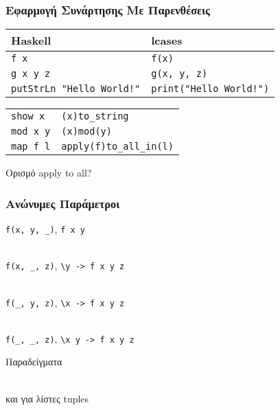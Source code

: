 \documentclass{beamer}
\def\e{\foreignlanguage{english}}
\begin{document}
\begin{frame}[fragile]

\frametitle{Εφαρμογή Συνάρτησης Με Παρενθέσεις}

\begin{otherlanguage}{english}

\begin{center}
\begin{tabular}{ |P{5cm}|P{5cm}| }
 \hline
 Haskell & lcases
 \\
 \hline
 \verb|f x| & \verb|f(x)|
 \\
 \verb|g x y z| & \verb|g(x, y, z)|
 \\
 \verb|putStrLn "Hello World!"| & \verb|print("Hello World!")|
 \\
 \hline
\end{tabular}
\end{center}

\begin{center}
\begin{tabular}{ |P{5cm}|P{5cm}| }
 \hline
 \verb|show x| & \verb|(x)to_string|
 \\
 \verb|mod x y| & \verb|(x)mod(y)|
 \\
 \verb|map f l| & \verb|apply(f)to_all_in(l)|
 \\
 \hline
\end{tabular}
\end{center}

\end{otherlanguage}
Ορισμό \e{apply to all}?

\end{frame}

\begin{frame}[fragile]

\frametitle{Ανώνυμες Παράμετροι}


\begin{otherlanguage}{english}

\verb|f(x, y, _)|, \verb|f x y|
\\~\

\verb|f(x, _, z)|, \verb|\y -> f x y z|
\\~\

\verb|f(_, y, z)|, \verb|\x -> f x y z|
\\~\

\verb|f(_, _, z)|, \verb|\x y -> f x y z|

\end{otherlanguage}


Παραδείγματα
\\~\

και για λίστες \e{tuples}

\end{frame}
\end{document}
